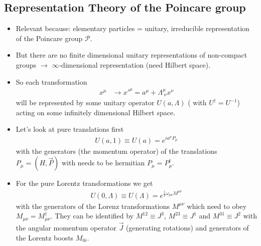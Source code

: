 \documentclass[10pt,a4paper]{article}
\theoremstyle{definition}
\begin{document}
\subsection{Representation Theory of the Poincare group}
\begin{itemize}
\item Relevant because: elementary particles  = unitary, irreducible representation of the Poincare group $\mathcal{P}$.

\item But there are no finite dimensional unitary representations of non-compact groups $\rightarrow$ $\infty$-dimensional representation (need Hilbert space).

\item So each transformation
\begin{align}
x^\mu&\rightarrow x'^{\mu}=a^\mu+\Lambda^\mu_{\;\nu}x^\nu
\end{align}
will be represented by some unitary operator $U(a,\Lambda)$ ( with $U^\dagger=U^{-1}$) acting on some infinitely dimensional Hilbert space.

\item Let's look at pure translations first
\begin{align}
U(a,1)\equiv U(a)=e^{ia^\mu P_\mu}
\end{align}
with the generators (the momentum operator) of the translations $P_\mu=(H,\vec{P})$ with needs to be hermitian $P_\mu=P^\dagger_\mu$.
\item For the pure Lorentz transformations we get
\begin{align}
U(0,\Lambda)\equiv U(\Lambda)=e^{\frac{i}{2}\omega_{\mu\nu} M^{\mu\nu}}
\end{align}
with the generators of the Lorenz transformations $M^{\mu\nu}$ which need to obey $M_{\mu\nu}=M^\dagger_{\mu\nu}$. They can be identified by $M^{12}\equiv J^3$, $M^{23}\equiv J^1$ and $M^{31}\equiv J^2$ with the angular momentum operator $\vec{J}$ (generating rotations) and generators of the Lorentz boosts $M_{0i}$.


\end{itemize}
\end{document}
